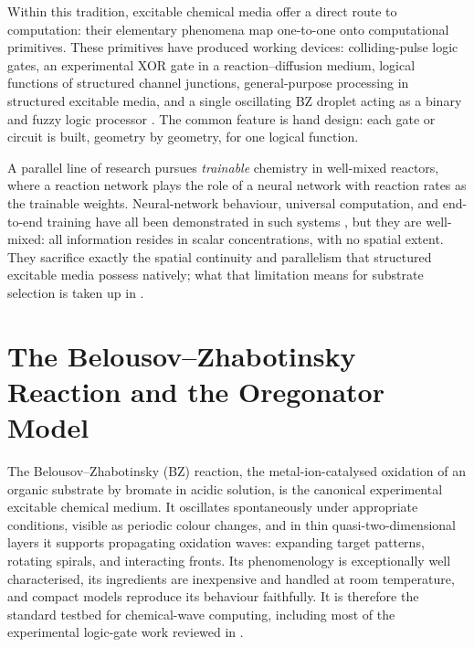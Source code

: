 Within this tradition, excitable chemical media offer a direct route to computation: their elementary phenomena map one-to-one onto computational primitives.
These primitives have produced working devices: colliding-pulse logic gates, an experimental XOR gate in a reaction--diffusion medium, logical functions of structured channel junctions, general-purpose processing in structured excitable media, and a single oscillating BZ droplet acting as a binary and fuzzy logic processor \cite{toth1995logic, steinbock1996chemical, adamatzky2002xor, adamatzky2002collision, sielewiesiuk2001logical, gorecki2009information, gentili2012chemical}.
The common feature is hand design: each gate or circuit is built, geometry by geometry, for one logical function.

A parallel line of research pursues \emph{trainable} chemistry in well-mixed reactors, where a reaction network plays the role of a neural network with reaction rates as the trainable weights.
Neural-network behaviour, universal computation, and end-to-end training have all been demonstrated in such systems \cite{hjelmfelt1991chemical, magnasco1997chemical, dack2024rncrn, cherry2018scaling}, but they are well-mixed: all information resides in scalar concentrations, with no spatial extent.
They sacrifice exactly the spatial continuity and parallelism that structured excitable media possess natively; what that limitation means for substrate selection is taken up in .

\section{The Belousov--Zhabotinsky Reaction and the Oregonator Model}
\label{sec:lit_bz}

The Belousov--Zhabotinsky (BZ) reaction, the metal-ion-catalysed oxidation of an organic substrate by bromate in acidic solution, is the canonical experimental excitable chemical medium. It oscillates spontaneously under appropriate conditions, visible as periodic colour changes, and in thin quasi-two-dimensional layers it supports propagating oxidation waves: expanding target patterns, rotating spirals, and interacting fronts. Its phenomenology is exceptionally well characterised, its ingredients are inexpensive and handled at room temperature, and compact models reproduce its behaviour faithfully. It is therefore the standard testbed for chemical-wave computing, including most of the experimental logic-gate work reviewed in .

